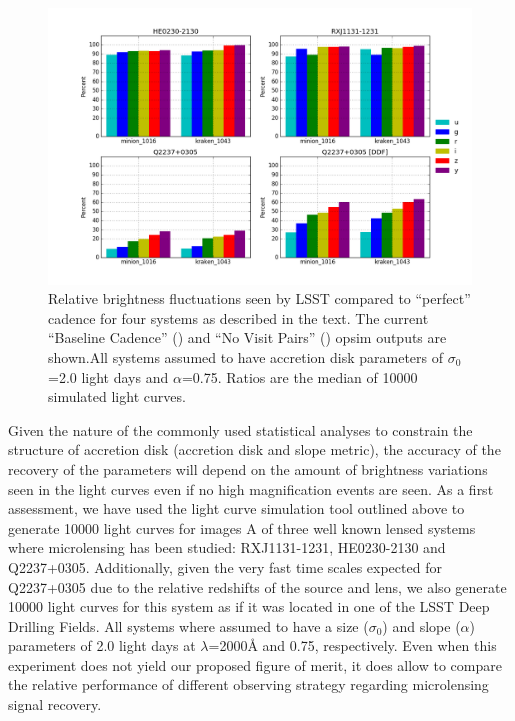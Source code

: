 \begin{center}
	\begin{figure}[hbt]
		\includegraphics[width=\textwidth]{figs/agn/ulens_sim.png}
		\caption{Relative brightness fluctuations seen by LSST compared to ``perfect'' cadence for four systems as described in the text. The current ``Baseline Cadence'' () and ``No Visit Pairs''	() opsim outputs are shown.All systems assumed to have accretion disk parameters of $\sigma_0$=2.0 light days and $\alpha$=0.75. Ratios are the median of 10000 simulated light curves.}
		\label{ulens_sim}
	\end{figure}
\end{center}


Given the nature of the commonly used statistical analyses to constrain the structure of accretion disk (accretion disk and slope metric), the accuracy of the recovery of the parameters will depend on the amount of brightness variations seen in the light curves even if no high magnification events are seen. As a first assessment, we have used the light curve simulation tool outlined above to generate 10000 light curves for images A of three well known lensed systems where microlensing has been studied: RXJ1131-1231, HE0230-2130 and Q2237+0305. Additionally, given the very fast time scales expected for Q2237+0305 due to the relative redshifts of the source and lens, we also generate 10000 light curves for this system as if it was located in one of the LSST Deep Drilling Fields. All systems where assumed to have a size ($\sigma_0$) and slope ($\alpha$) parameters of 2.0 light days at $\lambda$=2000\AA{} and 0.75, respectively. Even when this experiment does not yield our proposed figure of merit, it does allow to compare the relative performance of different observing strategy regarding microlensing signal recovery.

